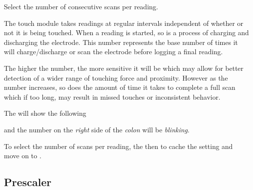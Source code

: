 Select the number of consecutive scans per reading.

\par\medskip

The touch module takes readings at regular intervals independent of whether
or not it is being touched. When a reading is started, so is a process of
charging and discharging the electrode.  This number represents the base number
of times it will charge\slash discharge or scan the electrode before logging a
final reading.

\par\medskip

The higher the number, the more sensitive it will be which may allow for better
detection of a wider range of touching force and proximity.  However as the
number increases, so does the amount of time it takes to complete a full scan
which if too long, may result in missed touches or inconsistent behavior.

\par\medskip


\par\medskip

The  will show the following


and the number on the \textit{right} side of the \textit{colon} will be
\textit{blinking}.

\par\medskip

To select the number of scans per reading,  the  then 
to cache the setting and move on to .


\subsection{Prescaler} 

